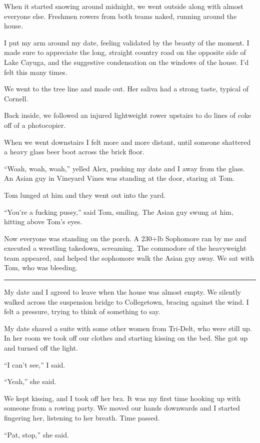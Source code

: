 When it started snowing around midnight, we went outside along with almost
everyone else.  Freshmen rowers from both teams naked, running around the house.

I put my arm around my date, feeling validated by the beauty of the moment.  I
made sure to appreciate the long, straight country road on the opposite side of
Lake Cayuga, and the suggestive condensation on the windows of the house.  I'd
felt this many times. 

We went to the tree line and made out.  Her saliva had a strong taste, typical
of Cornell.

Back inside, we followed an injured lightweight rower upstairs to do lines of
coke off of a photocopier. 

When we went downstairs I felt more and more distant, until someone shattered a
heavy glass beer boot across the brick floor.  

``Woah, woah, woah,'' yelled Alex, pushing my date and I away from the glass.
An Asian guy in Vineyard Vines was standing at the door, staring at Tom.

Tom lunged at him and they went out into the yard.

``You're a fucking pussy,'' said Tom, smiling.  The Asian guy swung at him,
hitting above Tom's eyes.  

Now everyone was standing on the porch.  A 230+lb Sophomore ran by me and
executed a wrestling takedown, screaming.  The commodore of the heavyweight team
appeared, and helped the sophomore walk the Asian guy away.  We sat with Tom,
who was bleeding.

\plainfancybreak{12pt}{2}{}

My date and I agreed to leave when the house was almost empty.  We silently
walked across the suspension bridge to Collegetown, bracing against the wind.  I
felt a pressure, trying to think of something to say.

My date shared a suite with some other women from Tri-Delt, who were still up.
In her room we took off our clothes and starting kissing on the bed.  She got up
and turned off the light.

``I can't see,'' I said.  

``Yeah,'' she said.

We kept kissing, and I took off her bra.  It was my first time hooking up with
someone from a rowing party.  We moved our hands downwards and I started
fingering her, listening to her breath.  Time passed.

``Pat, stop,'' she said.

